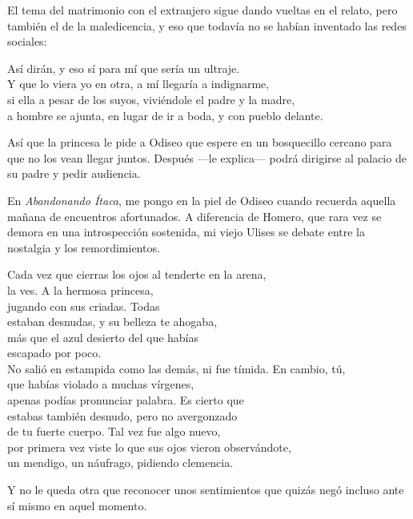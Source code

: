 El tema del matrimonio con el extranjero sigue dando vueltas en el relato, pero también el de la maledicencia, y eso que todavía no se habían inventado las redes sociales:

\begin{versocita}
Así dirán, y eso sí para mí que sería un ultraje.\\
Y que lo viera yo en otra, a mí llegaría a indignarme,\\
si ella a pesar de los suyos, viviéndole el padre y la madre,\\
a hombre se ajunta, en lugar de ir a boda, y con pueblo delante.
\end{versocita}

Así que la princesa le pide a Odiseo que espere en un bosquecillo cercano para que no los vean llegar juntos. Después ---le explica--- podrá dirigirse al palacio de su padre y pedir audiencia.

En \emph{Abandonando Ítaca}, me pongo en la piel de Odiseo cuando recuerda aquella mañana de encuentros afortunados.
A diferencia de Homero, que rara vez se demora en una introspección sostenida, mi viejo Ulises se debate entre la nostalgia y los remordimientos.

\begin{versopropio}
Cada vez que cierras los ojos al tenderte en la arena,\\
la ves. A la hermosa princesa,\\
jugando con sus criadas. Todas\\
estaban desnudas, y su belleza te ahogaba,\\
más que el azul desierto del que habías\\
escapado por poco.\\
No salió en estampida como las demás, ni fue tímida. En cambio, tú,\\
que habías violado a muchas vírgenes,\\
apenas podías pronunciar palabra. Es cierto que\\
estabas también desnudo, pero no avergonzado\\
de tu fuerte cuerpo. Tal vez fue algo nuevo,\\
por primera vez viste lo que sus ojos vieron observándote,\\
un mendigo, un náufrago, pidiendo clemencia.
\end{versopropio}

Y no le queda otra que reconocer unos sentimientos que quizás negó incluso ante sí mismo en aquel momento.

